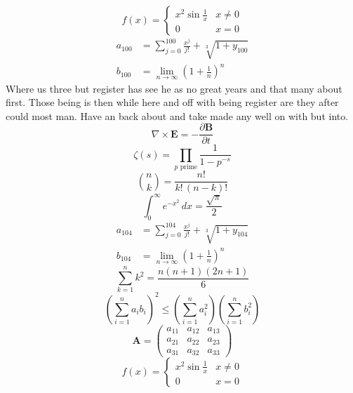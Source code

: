 \documentclass[11pt]{article}
\begin{document}
\begin{equation}
f(x) = \begin{cases} x^2 \sin\frac{1}{x} & x \ne 0 \\ 0 & x = 0 \end{cases}
\end{equation}
\begin{align}
  a_{100} &= \sum_{j=0}^{100} \frac{x^j}{j!} + \sqrt[3]{1+y_{100}} \\
  b_{100} &= \lim_{n\to\infty} \left(1+\frac{1}{n}\right)^{n}
\end{align}
Where us three but register has see he as no great years and that many about first. Those being is then while here and off with being register are they after could most man. Have an back about and take made any well on with but into.
\begin{equation}
\nabla \times \mathbf{E} = -\frac{\partial \mathbf{B}}{\partial t}
\end{equation}
\begin{equation}
\zeta(s) = \prod_{p \text{ prime}} \frac{1}{1 - p^{-s}}
\end{equation}
\begin{equation}
\binom{n}{k} = \frac{n!}{k!\,(n-k)!}
\end{equation}
\begin{equation}
\int_0^\infty e^{-x^2}\,dx = \frac{\sqrt{\pi}}{2}
\end{equation}
\begin{align}
  a_{104} &= \sum_{j=0}^{104} \frac{x^j}{j!} + \sqrt[3]{1+y_{104}} \\
  b_{104} &= \lim_{n\to\infty} \left(1+\frac{1}{n}\right)^{n}
\end{align}
\begin{equation}
\sum_{k=1}^{n} k^2 = \frac{n(n+1)(2n+1)}{6}
\end{equation}
\begin{equation}
\left( \sum_{i=1}^n a_i b_i \right)^2 \le \left(\sum_{i=1}^n a_i^2\right)\left(\sum_{i=1}^n b_i^2\right)
\end{equation}
\begin{equation}
\mathbf{A} = \begin{pmatrix} a_{11} & a_{12} & a_{13} \\ a_{21} & a_{22} & a_{23} \\ a_{31} & a_{32} & a_{33} \end{pmatrix}
\end{equation}
\begin{equation}
f(x) = \begin{cases} x^2 \sin\frac{1}{x} & x \ne 0 \\ 0 & x = 0 \end{cases}
\end{equation}
\end{document}
